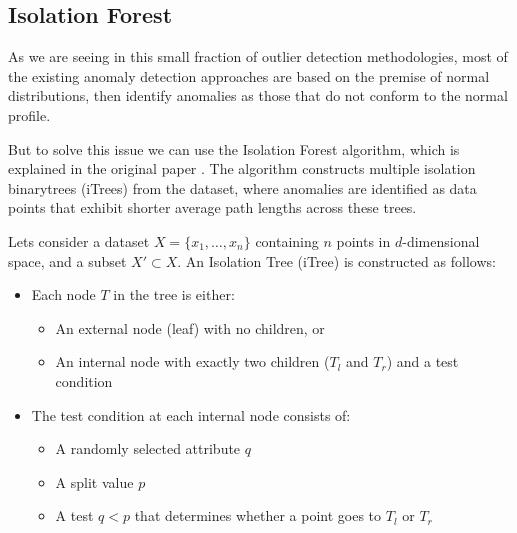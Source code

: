 \documentclass[11pt,english,a4paper,hidelinks]{book}
\begin{document}
    
\subsection{Isolation Forest}

As we are seeing in this small fraction of outlier detection methodologies, most of the existing anomaly detection approaches are based on the premise of normal distributions, then identify anomalies as those that do not conform to the normal profile.

\vspace{0.5cm}
\noindent But to solve this issue we can use the Isolation Forest algorithm, which is explained in the original paper \textcite{liu2012isolation}. The algorithm constructs multiple isolation binarytrees (iTrees) from the dataset, where anomalies are identified as data points that exhibit shorter average path lengths across these trees.

\vspace{0.5cm}
\noindent Lets consider a dataset $X = \{x_1, \dots, x_n\}$ containing $n$ points in $d$-dimensional space, and a subset $X' \subset X$. An Isolation Tree (iTree) is constructed as follows:

\begin{itemize}
    \item Each node $T$ in the tree is either:
    \begin{itemize}
        \item An external node (leaf) with no children, or
        \item An internal node with exactly two children ($T_l$ and $T_r$) and a test condition
    \end{itemize}
    \item The test condition at each internal node consists of:
    \begin{itemize}
        \item A randomly selected attribute $q$
        \item A split value $p$
        \item A test $q < p$ that determines whether a point goes to $T_l$ or $T_r$
    \end{itemize}
\end{itemize}
\end{document}
